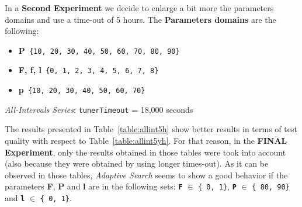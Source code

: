 In a {\bf Second Experiment} we decide to enlarge a bit more the parameters domains and use a time-out of 5 hours. The {\bf Parameters domains} are the following:
\begin{itemize}[itemsep=0.2mm]
	\item {\bf P}\texttt{ \{10, 20, 30, 40, 50, 60, 70, 80, 90\}}
	\item {\bf F, f, l}\texttt{ \{0, 1, 2, 3, 4, 5, 6, 7, 8\}}
	\item {\bf p}\texttt{ \{10, 20, 30, 40, 50, 60, 70\}}
\end{itemize}

\begin{table}[h] 	
\centering 
\renewcommand{\arraystretch}{1.2}
\caption{{\it All-Intervals Series}: \texttt{tunerTimeout} = 18,000 seconds}\label{table:allint5h}
\end{table}

The results presented in Table~\ref{table:allint5h} show better results in terms of test quality with respect to Table~\ref{table:allint5yh}. For that reason, in the \textbf{FINAL Experiment}, only the results obtained in those tables were took into account (also because they were obtained by using longer times-out). As it can be observed in those tables, {\it Adaptive Search} seems to show a good behavior if the parameters {\bf F}, {\bf P} and {\bf l} are in the following sets: \texttt{\bf F} $\in$ \texttt{\{ 0, 1\}}, \texttt{\bf P} $\in$ \texttt{\{ 80, 90\}} and \texttt{\bf l} $\in$ \texttt{\{ 0, 1\}}.

